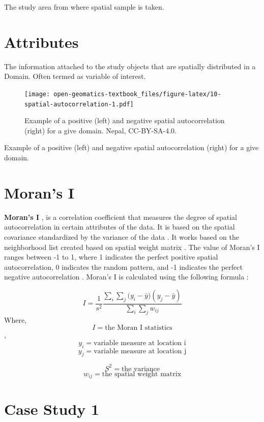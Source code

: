 \documentclass[
]{book}
\begin{document}
The study area from where spatial sample is taken.

\hypertarget{attributes}{%
\section{Attributes}\label{attributes}}

The information attached to the study objects that are spatially distributed in a Domain. Often termed as variable of interest.

\begin{figure}
\centering
\texttt{[image: open-geomatics-textbook\_files/figure-latex/10-spatial-autocorrelation-1.pdf]}
\caption{\label{fig:10-spatial-autocorrelation}Example of a positive (left) and negative spatial autocorrelation (right) for a give domain. Nepal, CC-BY-SA-4.0.}
\end{figure}

Example of a positive (left) and negative spatial autocorrelation (right) for a give domain.

\hypertarget{morans-i}{%
\section{Moran's I}\label{morans-i}}

\textbf{Moran's I} \citep{moran_notes_1950}, is a correlation coefficient that measures the degree of spatial autocorrelation in certain attributes of the data. It is based on the spatial covariance standardized by the variance of the data \citep{moran_notes_1950}. It works based on the neighborhood list created based on spatial weight matrix \citep{suryowati_comparison_2018}. The value of Moran's I ranges between -1 to 1, where 1 indicates the perfect positive spatial autocorrelation, 0 indicates the random pattern, and -1 indicates the perfect negative autocorrelation \citep{moran_notes_1950}. Moran's I is calculated using the following formula \citep{moran_notes_1950}:

\[
I= \frac{1}{s^2} \frac{\sum_{i}\sum_{j}({y_i-\bar{y})({y_j-\bar{y}})}}
{\sum_{i}\sum_{j}w_{ij}}
\]
Where, \[I=\text{the Moran I statistics}\], \[y_i=\text{variable measure at location i}\]
\[y_j=\text{variable measure at location j}\]

\[S^2=\text{the variance}\]
\[w_{ij}=\text{the spatial weight matrix}\]

\hypertarget{case-study-1}{%
\section{Case Study 1}\label{case-study-1}}
\end{document}
